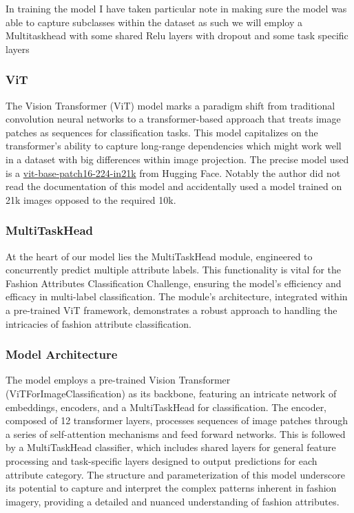 \documentclass{article}
\begin{document}
In training the model I have taken particular note in making sure the model was able to capture subclasses within the dataset as such we will employ a Multitaskhead with some shared Relu layers with dropout and some task specific layers 

\subsubsection{ViT}

The Vision Transformer (ViT) model marks a paradigm shift from traditional convolution neural networks to a transformer-based approach that treats image patches as sequences for classification tasks. This model capitalizes on the transformer's ability to capture long-range dependencies which might work well in a dataset with big differences within image projection. The precise model used is a \href{https://huggingface.co/google/vit-base-patch16-224-in21k}{vit-base-patch16-224-in21k} from Hugging Face. Notably the author did not read the documentation of this model and accidentally used a model trained on 21k images opposed to the required 10k. 

\subsubsection{MultiTaskHead}

At the heart of our model lies the MultiTaskHead module, engineered to concurrently predict multiple attribute labels. This functionality is vital for the Fashion Attributes Classification Challenge, ensuring the model's efficiency and efficacy in multi-label classification. The module's architecture, integrated within a pre-trained ViT framework, demonstrates a robust approach to handling the intricacies of fashion attribute classification.

\subsubsection{Model Architecture}
The model employs a pre-trained Vision Transformer (ViTForImageClassification) as its backbone, featuring an intricate network of embeddings, encoders, and a MultiTaskHead for classification. The encoder, composed of 12 transformer layers, processes sequences of image patches through a series of self-attention mechanisms and feed forward networks. This is followed by a MultiTaskHead classifier, which includes shared layers for general feature processing and task-specific layers designed to output predictions for each attribute category. The structure and parameterization of this model underscore its potential to capture and interpret the complex patterns inherent in fashion imagery, providing a detailed and nuanced understanding of fashion attributes. 
\end{document}
